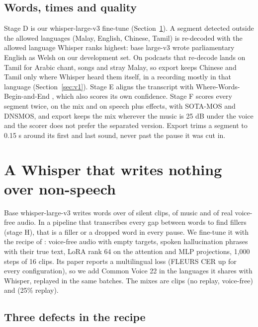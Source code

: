 \documentclass[10pt]{article}
\begin{document}
\subsection{Words, times and quality}

Stage D is our whisper-large-v3 fine-tune (Section~\ref{sec:asr}). A segment detected outside the allowed
languages (Malay, English, Chinese, Tamil) is re-decoded with the allowed language Whisper ranks highest:
base large-v3 wrote parliamentary English as Welsh on our development set. On podcasts that re-decode lands on Tamil
for Arabic chant, songs and stray Malay, so export keeps Chinese and Tamil only where Whisper heard them itself, in a
recording mostly in that language (Section~\ref{sec:v1}). Stage E aligns the transcript with
Where-Words-Begin-and-End \citep{zolkepli2026where}, which also scores its own confidence. Stage F scores every
segment twice, on the mix and on speech plus effects, with SOTA-MOS \citep{scicom2026sotamos} and DNSMOS, and
export keeps the mix wherever the music is 25 dB under the voice and the scorer does not prefer the separated
version. Export trims a segment to 0.15 s around its first and last sound, never past the pause it was cut in.

\section{A Whisper that writes nothing over non-speech}
\label{sec:asr}

Base whisper-large-v3 writes words over  of silent clips,  of
music and  of real voice-free audio. In a pipeline that transcribes every gap between
words to find fillers (stage H), that is a filler or a dropped word in every pause. We fine-tune it with the
recipe of \citet{zolkepli2026hallucination}: voice-free audio with empty targets, spoken hallucination phrases
with their true text, LoRA \citep{hu2022lora} rank 64 on the attention and MLP projections, 1,000 steps of 16
clips. Its paper reports a multilingual loss (FLEURS CER up for every configuration), so we add Common Voice 22
in the  languages it shares with Whisper, replayed in the same batches. The mixes
are  clips (no replay,  voice-free) and 
(25\% replay).

\subsection{Three defects in the recipe}
\end{document}
